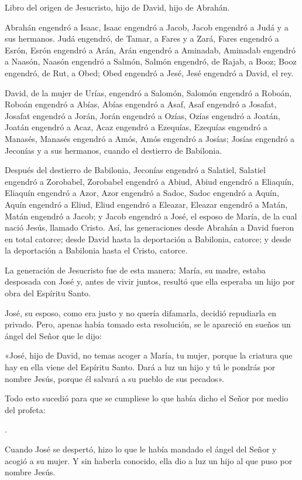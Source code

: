 \begin{scripture}
	Libro del origen de Jesucristo, hijo de David, hijo de Abrahán.
	
	Abrahán engendró a Isaac, Isaac engendró a Jacob, Jacob engendró a Judá y a sus hermanos. Judá engendró, de Tamar, a Fares y a Zará, Fares engendró a Esrón, Esrón engendró a Arán, Arán engendró a Aminadab, Aminadab engendró a Naasón, Naasón engendró a Salmón, Salmón engendró, de Rajab, a Booz; Booz engendró, de Rut, a Obed; Obed engendró a Jesé, Jesé engendró a David, el rey.
	
	David, de la mujer de Urías, engendró a Salomón, Salomón engendró a Roboán, Roboán engendró a Abías, Abías engendró a Asaf, Asaf engendró a Josafat, Josafat engendró a Jorán, Jorán engendró a Ozías, Ozías engendró a Joatán, Joatán engendró a Acaz, Acaz engendró a Ezequías, Ezequías engendró a Manasés, Manasés engendró a Amós, Amós engendró a Josías; Josías engendró a Jeconías y a sus hermanos, cuando el destierro de Babilonia.
	
	Después del destierro de Babilonia, Jeconías engendró a Salatiel, Salatiel engendró a Zorobabel, Zorobabel engendró a Abiud, Abiud engendró a Eliaquín, Eliaquín engendró a Azor, Azor engendró a Sadoc, Sadoc engendró a Aquín, Aquín engendró a Eliud, Eliud engendró a Eleazar, Eleazar engendró a Matán, Matán engendró a Jacob; y Jacob engendró a José, el esposo de María, de la cual nació Jesús, llamado Cristo. Así, las generaciones desde Abrahán a David fueron en total catorce; desde David hasta la deportación a Babilonia, catorce; y desde la deportación a Babilonia hasta el Cristo, catorce.
	
	La generación de Jesucristo fue de esta manera: María, su madre, estaba desposada con José y, antes de vivir juntos, resultó que ella esperaba un hijo por obra del Espíritu Santo.
	
	José, su esposo, como era justo y no quería difamarla, decidió repudiarla en privado. Pero, apenas había tomado esta resolución, se le apareció en sueños un ángel del Señor que le dijo:
	
	«José, hijo de David, no temas acoger a María, tu mujer, porque la criatura que hay en ella viene del Espíritu Santo. Dará a luz un hijo y tú le pondrás por nombre Jesús, porque él salvará a su pueblo de sus pecados».
	
	Todo esto sucedió para que se cumpliese lo que había dicho el Señor por medio del profeta:
	
	.
	
	Cuando José se despertó, hizo lo que le había mandado el ángel del Señor y acogió a su mujer. Y sin haberla conocido, ella dio a luz un hijo al que puso por nombre Jesús.
\end{scripture}

